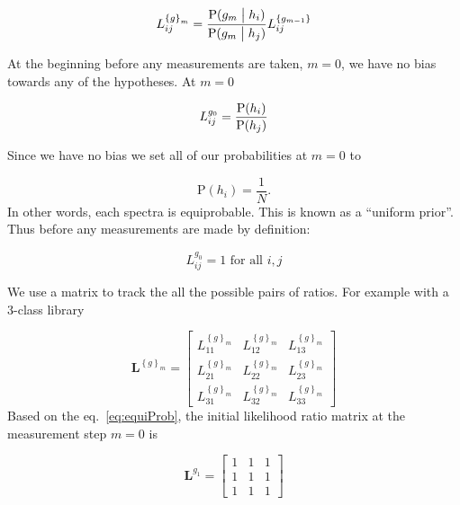 \begin{equation}\label{eq:updateProcedure}
    L_{ij}^{\left\{ g \right\}_m} =
    {
        \mbox{P}( g_m \bigm\vert {h}_i )
    \over
        \mbox{P}( g_m \bigm\vert {h}_j )
    }
    L_{ij}^{\left\{ g_{m-1} \right\}}
\end{equation}

At the beginning before any measurements are taken, $m=0$, we have no bias towards any of the hypotheses. At $m = 0$

\begin{equation}\label{eq:uniformPrior1}
    L_{ij}^{g_0} =
    {
       \mbox{P}( {h}_i )
    \over
       \mbox{P}( {h}_j )
    }
\end{equation}

Since we have no bias we set all of our probabilities at $m=0$ to

\begin{equation}\label{eq:uniformPrior2}
    \mbox{P}( {h}_i)
    =
    \frac{1}{N}.
\end{equation}
%
In other words, each spectra is equiprobable. This is known as a ``uniform prior''. Thus before any measurements are made by definition:

\begin{equation}\label{eq:equiProb}
    L_{ij}^{ g_0 } = 1 \mbox{ for all } i,j
\end{equation}

We use a matrix to track the all the possible pairs of ratios. For example with a 3-class library

\begin{equation}
    \mathbf{L}^{\left\{ g \right\}_m}
    =
    \begin{bmatrix}
      L_{11}^{\left\{ g \right\}_m}  & L_{12}^{\left\{ g \right\}_m}  & L_{13}^{\left\{ g \right\}_m}  \\
      L_{21}^{\left\{ g \right\}_m}  & L_{22}^{\left\{ g \right\}_m}  & L_{23}^{\left\{ g \right\}_m}  \\
      L_{31}^{\left\{ g \right\}_m}  & L_{32}^{\left\{ g \right\}_m}  & L_{33}^{\left\{ g \right\}_m}
    \end{bmatrix}
\end{equation}
%
Based on the eq.~\ref{eq:equiProb}, the initial likelihood ratio matrix at the measurement step $m = 0$ is

\begin{equation}
    \mathbf{L}^{ g_1 }
    =
    \begin{bmatrix}
      1  & 1 & 1 \\
      1  & 1 & 1 \\
      1  & 1 & 1
    \end{bmatrix}
\end{equation}

